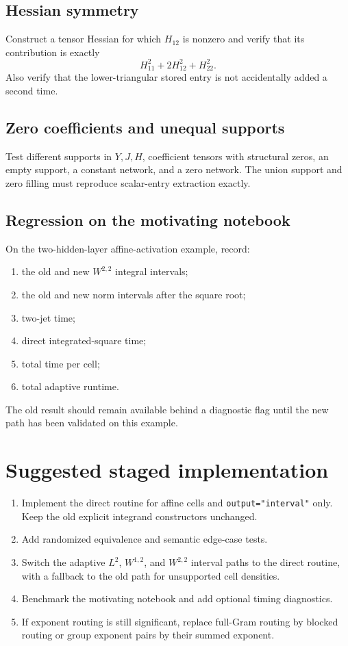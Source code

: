 \documentclass[11pt]{article}
\begin{document}
\subsection{Hessian symmetry}

Construct a tensor Hessian for which \(H_{12}\) is nonzero and verify that its
contribution is exactly
\[
    H_{11}^2+2H_{12}^2+H_{22}^2.
\]
Also verify that the lower-triangular stored entry is not accidentally added a
second time.

\subsection{Zero coefficients and unequal supports}

Test different supports in \(Y,J,H\), coefficient tensors with structural
zeros, an empty support, a constant network, and a zero network.  The union
support and zero filling must reproduce scalar-entry extraction exactly.

\subsection{Regression on the motivating notebook}

On the two-hidden-layer affine-activation example, record:
\begin{enumerate}[label=\arabic*.]
    \item the old and new \(W^{2,2}\) integral intervals;
    \item the old and new norm intervals after the square root;
    \item two-jet time;
    \item direct integrated-square time;
    \item total time per cell;
    \item total adaptive runtime.
\end{enumerate}
The old result should remain available behind a diagnostic flag until the new
path has been validated on this example.

\section{Suggested staged implementation}

\begin{enumerate}[label=\textbf{Stage \arabic*.},leftmargin=2.2cm]
    \item Implement the direct routine for affine cells and
    \texttt{output="interval"} only.  Keep the old explicit integrand
    constructors unchanged.
    \item Add randomized equivalence and semantic edge-case tests.
    \item Switch the adaptive \(L^2\), \(W^{1,2}\), and \(W^{2,2}\) interval
    paths to the direct routine, with a fallback to the old path for unsupported
    cell densities.
    \item Benchmark the motivating notebook and add optional timing diagnostics.
    \item If exponent routing is still significant, replace full-Gram routing
    by blocked routing or group exponent pairs by their summed exponent.
\end{enumerate}
\end{document}
